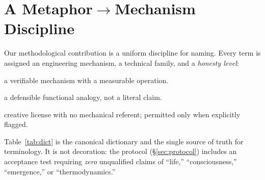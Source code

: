 \documentclass[11pt]{article}
\begin{document}
\section{A Metaphor$\rightarrow$Mechanism Discipline}
\label{sec:honesty}
Our methodological contribution is a uniform discipline for naming. Every term
is assigned an engineering mechanism, a technical family, and a
\emph{honesty level}:
\begin{honesty}
\item[\textbf{N1 (concrete)}] a verifiable mechanism with a measurable operation.
\item[\textbf{N2 (analogy)}] a defensible functional analogy, not a literal claim.
\item[\textbf{N3 (narrative)}] creative license with no mechanical referent;
permitted only when explicitly flagged.
\end{honesty}

Table~\ref{tab:dict} is the canonical dictionary and the single source of truth
for terminology. It is not decoration: the protocol (\S\ref{sec:protocol})
includes an acceptance test requiring \emph{zero} unqualified claims of ``life,''
``consciousness,'' ``emergence,'' or ``thermodynamics.''
\end{document}
